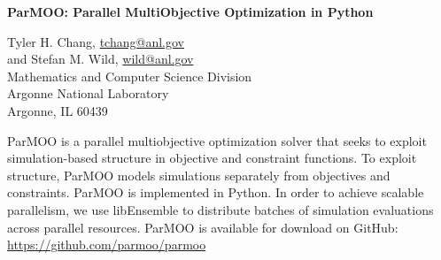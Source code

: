 \documentclass[11pt,letterpaper]{article}
\begin{document}
\begin{center}
\textbf{\Large ParMOO: Parallel MultiObjective Optimization in Python}
\end{center}

\medskip

\begin{center}
Tyler H. Chang, \url{tchang@anl.gov}\\ 
and Stefan M. Wild, \url{wild@anl.gov}\\
Mathematics and Computer Science Division \\                          
Argonne National Laboratory \\
Argonne, IL 60439 
\end{center}

\medskip\noindent

ParMOO is a parallel multiobjective optimization solver that seeks to exploit
simulation-based structure in objective and constraint functions.
To exploit structure, ParMOO models simulations separately from objectives
and constraints.
ParMOO is implemented in Python.
In order to achieve scalable parallelism, we use libEnsemble to distribute
batches of simulation evaluations across parallel resources.
ParMOO is available for download on GitHub:
\url{https://github.com/parmoo/parmoo}
\end{document}
